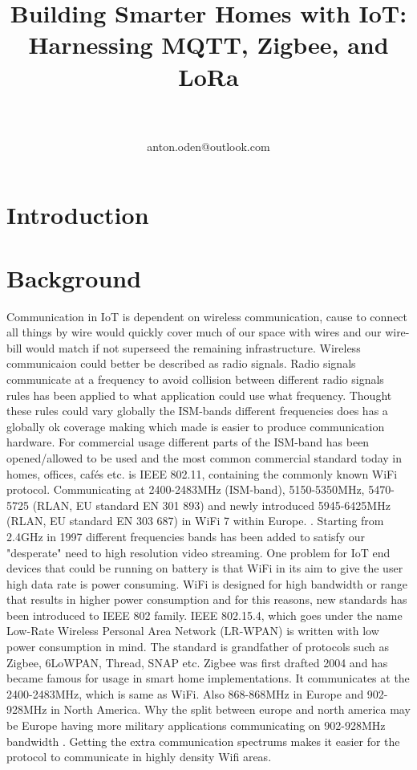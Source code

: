 \documentclass[article,a4paper]{IEEEtran}
\title{Building Smarter Homes with IoT: Harnessing MQTT, Zigbee, and LoRa}
\author{
\IEEEauthorblockN{Anton Odén}\\
\IEEEauthorblockA{Dept. of Maths and Computer Science\\Karlstad University\\
651 88 KARLSTAD, Sweden}\\
anton.oden@outlook.com
}
\begin{document}
\maketitle

    \begin{abstract}
        
    \end{abstract}

    \section{Introduction}

    \section{Background}
    Communication in IoT is dependent on wireless communication, cause to connect all things by wire would quickly cover much of our space with wires and our wire-bill would match if not superseed the remaining infrastructure. Wireless communicaion could better be described as radio signals. Radio signals communicate at a frequency to avoid collision between different radio signals rules has been applied to what application could use what frequency. Thought these rules could vary globally the ISM-bands different frequencies does has a globally ok coverage making which made is easier to produce communication hardware. For commercial usage different parts of the ISM-band has been opened/allowed to be used \cite{ISM-band1} and the most common commercial standard today in homes, offices, cafés etc. is IEEE 802.11, containing the commonly known WiFi protocol. Communicating at 2400-2483MHz (ISM-band), 5150-5350MHz, 5470-5725 (RLAN, EU standard EN 301 893) and newly introduced 5945-6425MHz (RLAN, EU standard EN 303 687) in WiFi 7 within Europe. \cite{ISM-bandEUR}. Starting from 2.4GHz in 1997 different frequencies bands has been added to satisfy our "desperate" need to high resolution video streaming. 
    \newline\newline
    One problem for IoT end devices that could be running on battery is that WiFi in its aim to give the user high data rate is power consuming. WiFi is designed for high bandwidth or range that results in higher power consumption and for this reasons, new standards has been introduced to IEEE 802 family. 
    \newline\newline
    IEEE 802.15.4, which goes under the name Low-Rate Wireless Personal Area Network (LR-WPAN) is written with low power consumption in mind. The standard is grandfather of protocols such as Zigbee, 6LoWPAN, Thread, SNAP etc. Zigbee was first drafted 2004 and has became famous for usage in smart home implementations. It communicates at the 2400-2483MHz, which is same as WiFi. Also 868-868MHz in Europe and 902-928MHz in North America. Why the split between europe and north america may be Europe having more military applications communicating on 902-928MHz bandwidth \cite{ISM-bandEUR}. Getting the extra communication spectrums makes it easier for the protocol to communicate in highly density Wifi areas. 
\end{document}
